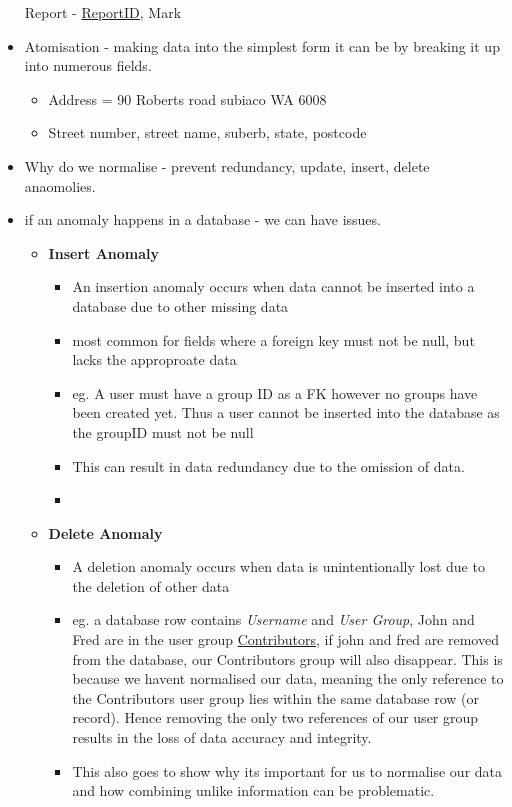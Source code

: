 \documentclass[12pt, a4, twoside]{article}
\begin{document}
\begin{center}
\begin{itemize}
\begin{center}
      Report - \underline{ReportID}, Mark
    \end{center}
    \item Atomisation - making data into the simplest form it can be by breaking it up into numerous fields. 
    \begin{itemize}
      \item Address = 90 Roberts road subiaco WA 6008
      \item Street number, street name, suberb, state, postcode
    \end{itemize}
    \item Why do we normalise - prevent redundancy, update, insert, delete anaomolies. 
    \item if an anomaly happens in a database - we can have issues. 
    \begin{itemize}
      \item \textbf{Insert Anomaly}
      \begin{itemize}
        \item An insertion anomaly occurs when data cannot be inserted into a database due to other missing data
        \item most common for fields where a foreign key must not be null, but lacks the approproate data
        \item eg. A user must have a group ID as a FK however no groups have been created yet. Thus a user cannot be inserted into the database as the groupID must not be null
        \item This can result in data redundancy due to the omission of data.
        \item 
      \end{itemize}
      \item \textbf{Delete Anomaly}
      \begin{itemize}
        \item A deletion anomaly occurs when data is unintentionally lost due to the deletion of other data
        \item eg. a database row contains \textit{Username} and \textit{User Group}, John and Fred are in the user group \underline{Contributors}, if john and fred are removed from the database, our Contributors group will also disappear. This is because we havent normalised our data, meaning the only reference 
        to the Contributors user group lies within the same database row (or record). Hence removing the only two references of our user group results in the loss of data accuracy and integrity. 
        \item This also goes to show why its important for us to normalise our data and how combining unlike information can be problematic. 

\end{itemize}
\end{itemize}
\end{itemize}
\end{center}
\end{document}
